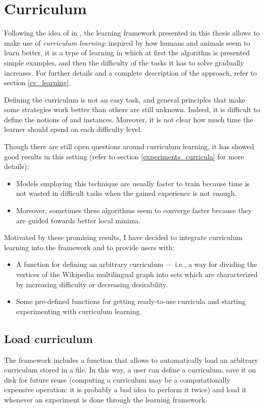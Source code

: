     \section{Curriculum}\label{curriculum}
        Following the idea of \citeauthor{Bengio} in \cite{Bengio}, the learning framework presented in this thesis allows to make use of \emph{curriculum learning}: inspired by how humans and animals seem to learn better, it is a type of learning in which at first the algorithm is presented simple examples, and then the difficulty of the tasks it has to solve gradually increases. For further details and a complete description of the approach, refer to section \ref{cv_learning}.
        
        Defining the curriculum is not an easy task, and general principles that make some strategies work better than others are still unknown. Indeed, it is difficult to define the notions of  and  instances. Moreover, it is not clear how much time the learner should spend on each difficulty level.
        
        Though there are still open questions around curriculum learning, it has showed good results in this setting (refer to section \ref{experiments_curricula} for more details):
        \begin{itemize}
            \item Models employing this technique are usually faster to train because time is not wasted in difficult tasks when the gained experience is not enough.
            \item Moreover, sometimes these algorithms seem to converge faster because they are guided towards better local minima.
        \end{itemize}
        Motivated by these promising results, I have decided to integrate curriculum learning into the framework and to provide users with:
        \begin{itemize}
            \item A function for defining an arbitrary curriculum --- i.e., a way for dividing the vertices of the Wikipedia multilingual graph into sets which are characterized by increasing difficulty or decreasing desirability.
            \item Some pre-defined functions for getting ready-to-use curricula and starting experimenting with curriculum learning.
        \end{itemize}
        \subsection{Load curriculum}
            The framework includes a function that allows to automatically load an arbitrary curriculum stored in a file. In this way, a user can define a curriculum, save it on disk for future reuse (computing a curriculum may be a computationally expensive operation: it is probably a bad idea to perform it twice) and load it whenever an experiment is done through the learning framework.
            
